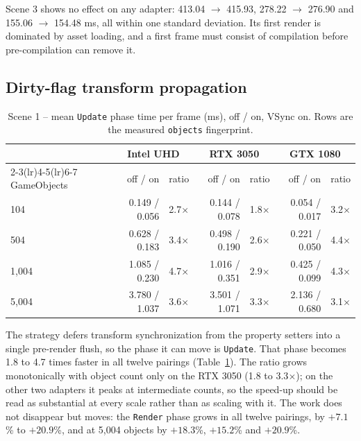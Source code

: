 Scene 3 shows no effect on any adapter: 413.04 $\rightarrow$ 415.93, 278.22 $\rightarrow$ 276.90 and 155.06 $\rightarrow$ 154.48 ms, all within one standard deviation. Its first render is dominated by asset loading, and a first frame must consist of compilation before pre-compilation can remove it.

\subsection{Dirty-flag transform propagation}
\label{sec:res-dirty}

\begin{table}[H]
\centering\small\setlength{\tabcolsep}{4pt}
\caption{Scene 1 -- mean \texttt{Update} phase time per frame (ms), off / on, VSync on. Rows are the measured \texttt{objects} fingerprint.}
\label{tab:dirty-update}
\begin{tabular}{lrrrrrr}
\toprule
& \multicolumn{2}{c}{Intel UHD} & \multicolumn{2}{c}{RTX 3050} & \multicolumn{2}{c}{GTX 1080} \\
\cmidrule(lr){2-3}\cmidrule(lr){4-5}\cmidrule(lr){6-7}
GameObjects & off / on & ratio & off / on & ratio & off / on & ratio \\
\midrule
104     & 0.149 / 0.056 & 2.7$\times$ & 0.144 / 0.078 & 1.8$\times$ & 0.054 / 0.017 & 3.2$\times$ \\
504     & 0.628 / 0.183 & 3.4$\times$ & 0.498 / 0.190 & 2.6$\times$ & 0.221 / 0.050 & 4.4$\times$ \\
1{,}004 & 1.085 / 0.230 & 4.7$\times$ & 1.016 / 0.351 & 2.9$\times$ & 0.425 / 0.099 & 4.3$\times$ \\
5{,}004 & 3.780 / 1.037 & 3.6$\times$ & 3.501 / 1.071 & 3.3$\times$ & 2.136 / 0.680 & 3.1$\times$ \\
\bottomrule
\end{tabular}
\end{table}

The strategy defers transform synchronization from the property setters into a single pre-render flush, so the phase it can move is \texttt{Update}. That phase becomes 1.8 to 4.7 times faster in all twelve pairings (Table~\ref{tab:dirty-update}). The ratio grows monotonically with object count only on the RTX 3050 (1.8 to 3.3$\times$); on the other two adapters it peaks at intermediate counts, so the speed-up should be read as substantial at every scale rather than as scaling with it. The work does not disappear but moves: the \texttt{Render} phase grows in all twelve pairings, by $+7.1$\% to $+20.9$\%, and at 5{,}004 objects by $+18.3$\%, $+15.2$\% and $+20.9$\%.

